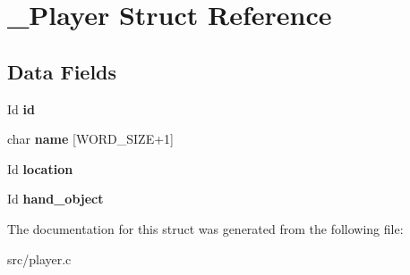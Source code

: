 \hypertarget{struct__Player}{}\section{\+\_\+\+Player Struct Reference}
\label{struct__Player}
\subsection*{Data Fields}
\begin{DoxyCompactItemize}
\item 
\mbox{\label{struct__Player_a60d635cd063816a9c1bd873f4868bb90}} 
Id {\bfseries id}
\item 
\mbox{\label{struct__Player_ac89715f913cc607b75eb7236765c41f5}} 
char {\bfseries name} \mbox{[}W\+O\+R\+D\+\_\+\+S\+I\+ZE+1\mbox{]}
\item 
\mbox{\label{struct__Player_adbb6195d15b88f3f658e74274eff52d8}} 
Id {\bfseries location}
\item 
\mbox{\label{struct__Player_a1d3b7bfde0c5815016b2f6fa2c9d63c7}} 
Id {\bfseries hand\+\_\+object}
\end{DoxyCompactItemize}


The documentation for this struct was generated from the following file\+:\begin{DoxyCompactItemize}
\item 
src/player.\+c\end{DoxyCompactItemize}
